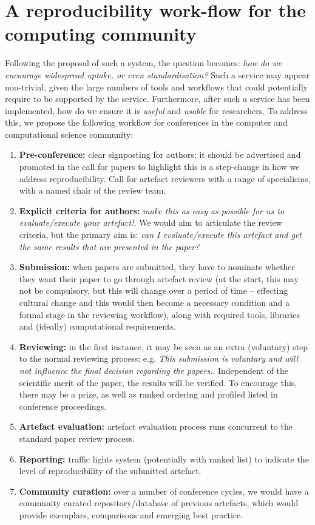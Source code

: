 \documentclass[conference]{IEEEtran}
\begin{document}
\section{A reproducibility work-flow for the computing community}
\label{rollout}

Following the proposal of such a system, the question becomes:
{\emph{how do we encourage widespread uptake, or even
    standardisation?}}  Such a service may appear non-trivial, given
the large numbers of tools and workflows that could potentially
require to be supported by the service. Furthermore, after such a
service has been implemented, how do we ensure it is \emph{useful} and
\emph{usable} for researchers. To address this, we propose the
following workflow for conferences in the computer and computational
science community:

\begin{enumerate}
\item {\textbf{Pre-conference:}} clear signposting for authors; it
should be advertised and promoted in the call for papers to
highlight this is a step-change in how we address
reproducibility. Call for artefact reviewers with a range of
specialisms, with a named chair of the review team.
\item {\textbf{Explicit criteria for authors:}} {\emph{make this as
easy as possible for us to evaluate/execute your artefact!}}. We would
aim to articulate the review criteria, but the primary aim is:
{\emph{can I evaluate/execute this artefact and get the same results
that are presented in the paper?}}
\item {\textbf{Submission:}} when papers are submitted, they have to
nominate whether they want their paper to go through artefact review
(at the start, this may not be compulsory, but this will change over a
period of time -- effecting cultural change and this would then become
a necessary condition and a formal stage in the reviewing workflow),
along with required tools, libraries and (ideally) computational
requirements.
\item {\textbf{Reviewing:}} in the first instance, it may be seen as
an extra (voluntary) step to the normal reviewing process:
e.g. {\emph{This submission is voluntary and will not influence the
final decision regarding the papers.}}. Independent of the scientific
merit of the paper, the results will be verified. To encourage this,
there may be a prize, as well as ranked ordering and profiled listed
in conference proceedings.
\item {\textbf{Artefact evaluation:}} artefact evaluation process runs
concurrent to the standard paper review process.
\item {\textbf{Reporting:}} traffic lights system (potentially with
ranked list) to indicate the level of reproducibility of the submitted
artefact.
\item {\textbf{Community curation:}} over a number of conference
  cycles, we would have a community curated repository/database of
  previous artefacts, which would provide exemplars, comparisons and
  emerging best practice.
\end{enumerate}
\end{document}
